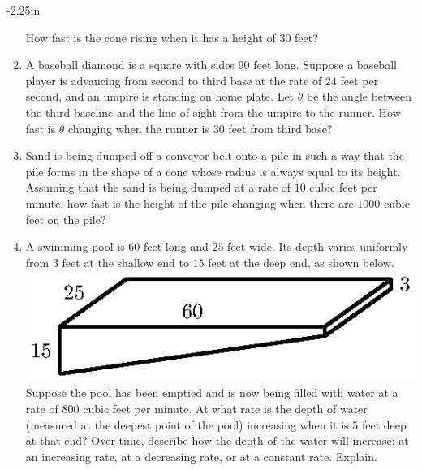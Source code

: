\begin{adjustwidth*}{}{-2.25in}
\begin{multicols*}{2}
\begin{enumerate}[1),start=12]
How fast is the cone rising when it has a height of $30$ feet?

\item A baseball diamond is a square with sides $90$ feet long.  Suppose a baseball player is advancing from second to third base at the rate of $24$ feet per second, and an umpire is standing on home plate.  Let  $\theta$ be the angle between the third baseline and the line of sight from the umpire to the runner.  How fast is $\theta$ changing when the runner is $30$ feet from third base?
	
\item Sand is being dumped off a conveyor belt onto a pile in such a way that the pile forms in the shape of a cone whose radius is always equal to its height.  Assuming that the sand is being dumped at a rate of $10$ cubic feet per minute, how fast is the height of the pile changing when there are $1000$ cubic feet on the pile?
	
\item A swimming pool is $60$ feet long and $25$ feet wide. Its depth varies uniformly from $3$ feet at the shallow end to $15$ feet at the deep end, as shown below.
\includegraphics{figures/3_5_Ez3.eps}
Suppose the pool has been emptied and is now being filled with water at a rate of $800$ cubic feet per minute. At what rate is the depth of water (measured at the deepest point of the pool) increasing when it is $5$ feet deep at that end?  Over time, describe how the depth of the water will increase:  at an increasing rate, at a decreasing rate, or at a constant rate.  Explain.

\end{enumerate}

\end{multicols*}
\end{adjustwidth*}

\afterexercises